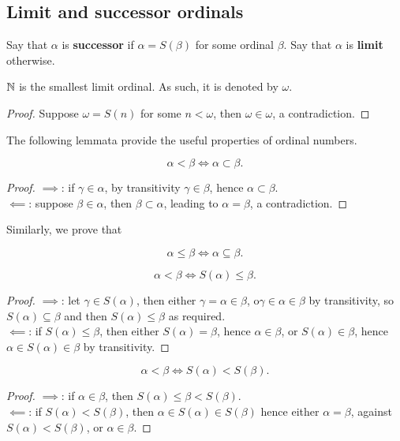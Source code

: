 \documentclass[twoside,openright,titlepage,numbers=noenddot,%
               headinclude,footinclude,cleardoublepage=empty,abstract=on,
               BCOR=23mm,paper=letter,fontsize=11pt
               ]{scrreprt}
\begin{document}
\subsection{Limit and successor ordinals}
Say that $\alpha$ is \textbf{successor} if $\alpha = S(\beta)$ for some ordinal $\beta$. Say that $\alpha$ is \textbf{limit} otherwise.
\begin{theorem}
    $\mathbb{N}$ is the smallest limit ordinal. As such, it is denoted by $\omega$.
\end{theorem}
\begin{proof}
    Suppose $\omega = S(n)$ for some $n < \omega$, then $\omega \in \omega$, a contradiction.
\end{proof}
The following lemmata provide the useful properties of ordinal numbers.
\begin{lemma}
    \[ \alpha < \beta \iff \alpha \subset \beta. \]
\end{lemma}
\begin{proof}
    $\implies$: if $\gamma \in \alpha$, by transitivity $\gamma \in \beta$, hence $\alpha \subset \beta$. \\
    $\impliedby$: suppose $\beta \in \alpha$, then $\beta \subset \alpha$, leading to $\alpha = \beta$, a contradiction.
\end{proof}
Similarly, we prove that
\begin{lemma}
    \[ \alpha \leq \beta \iff \alpha \subseteq \beta. \]
\end{lemma}
\begin{lemma}
    \[ \alpha < \beta \iff S(\alpha) \leq \beta. \]
\end{lemma}
\begin{proof}
    $\implies$: let $\gamma \in S(\alpha)$, then either $\gamma = \alpha \in \beta$, o$ \gamma \in \alpha \in \beta$ by transitivity, so $S(\alpha) \subseteq \beta$ and then $S(\alpha) \leq \beta$ as required. \\
    $\impliedby$: if $S(\alpha) \leq \beta$, then either $S(\alpha) = \beta$, hence $\alpha \in \beta$, or $S(\alpha) \in \beta$, hence $\alpha \in S(\alpha) \in \beta$ by transitivity.
\end{proof}
\begin{lemma}
    \[ \alpha < \beta \iff S(\alpha) < S(\beta). \]
\end{lemma}
\begin{proof}
    $\implies$: if $\alpha \in \beta$, then $S(\alpha) \leq \beta < S(\beta)$. \\
    $\impliedby$: if $S(\alpha) < S(\beta)$, then $\alpha \in S(\alpha) \in S(\beta)$ hence either $\alpha = \beta$, against $S(\alpha) < S(\beta)$, or $\alpha \in \beta$.
\end{proof}
\end{document}
